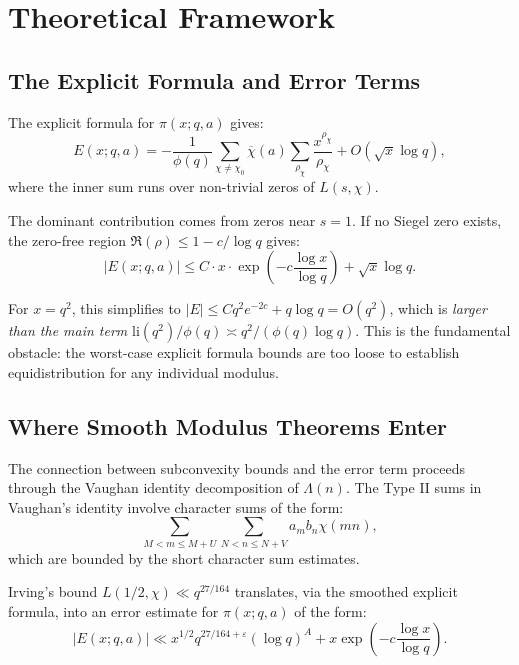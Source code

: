 \documentclass[11pt]{article}
\begin{document}
\section{Theoretical Framework}

\subsection{The Explicit Formula and Error Terms}

The explicit formula for $\pi(x; q, a)$ gives:
\begin{equation}
E(x; q, a) = -\frac{1}{\phi(q)} \sum_{\chi \neq \chi_0}
\overline{\chi}(a) \sum_{\rho_\chi} \frac{x^{\rho_\chi}}{\rho_\chi}
+ O(\sqrt{x}\log q),
\end{equation}
where the inner sum runs over non-trivial zeros of $L(s, \chi)$.

The dominant contribution comes from zeros near $s = 1$. If no Siegel
zero exists, the zero-free region $\Re(\rho) \leq 1 - c/\log q$ gives:
\begin{equation}
|E(x; q, a)| \leq C \cdot x \cdot \exp\left(-c\frac{\log x}{\log q}\right)
+ \sqrt{x}\log q.
\end{equation}

For $x = q^2$, this simplifies to $|E| \leq C q^2 e^{-2c} + q\log q = O(q^2)$,
which is \emph{larger than the main term} $\mathrm{li}(q^2)/\phi(q) \asymp
q^2/(\phi(q)\log q)$. This is the fundamental obstacle: the worst-case
explicit formula bounds are too loose to establish equidistribution for
any individual modulus.

\subsection{Where Smooth Modulus Theorems Enter}

The connection between subconvexity bounds and the error term proceeds
through the Vaughan identity decomposition of $\Lambda(n)$. The Type II
sums in Vaughan's identity involve character sums of the form:
\begin{equation}
\sum_{M < m \leq M+U} \sum_{N < n \leq N+V} a_m b_n \chi(mn),
\end{equation}
which are bounded by the short character sum estimates.

Irving's bound $L(1/2, \chi) \ll q^{27/164}$ translates, via the smoothed
explicit formula, into an error estimate for $\pi(x; q, a)$ of the form:
\begin{equation}
|E(x; q, a)| \ll x^{1/2} q^{27/164 + \varepsilon} (\log q)^A + x
\exp\left(-c\frac{\log x}{\log q}\right).
\end{equation}
\end{document}
